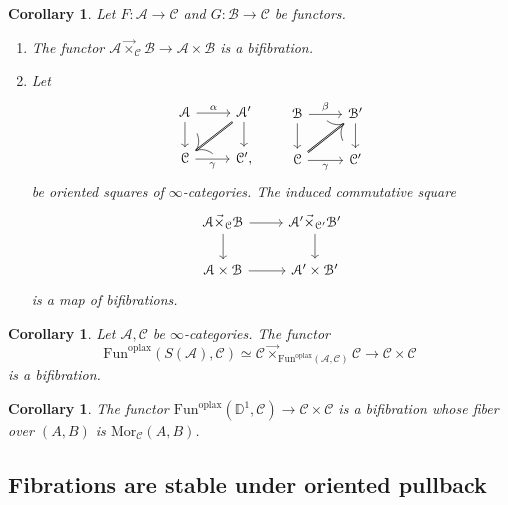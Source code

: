 \documentclass[10pt,oneside]{article}
\numberwithin{equation}{section} %
\numberwithin{figure}{section} %
\theoremstyle{plain}
\newtheorem{corollary}[theorem]{Corollary}
\theoremstyle{definition}
\newcommand{\bD}{{\mathbb D}}
\newcommand{\mA}{{\mathcal A}}
\newcommand{\mB}{{\mathcal B}}
\newcommand{\mC}{{\mathcal C}}
\newcommand{\Fun}{\mathrm{Fun}}
\newcommand{\oplax}{{\mathrm{oplax}}}
\newcommand{\Mor}{{\mathrm{Mor}}}
\begin{document}
\begin{corollary}\label{targetFib}Let $F: \mA \to \mC$ and  $G: \mB \to \mC$ be functors.

\begin{enumerate}[\normalfont(1)]\setlength{\itemsep}{-2pt}
\item The functor $ \mA {\vec{\times}}_\mC \mB \to \mA \times \mB $
is a bifibration.

\item Let
$$
\begin{tikzcd}
\mA \ar{r}{\alpha} \ar{d}[swap]{} & \mA' \ar[double]{dl}{} \ar{d}{} \\
\mC  \ar{r}[swap]{\gamma} & \mC',
\end{tikzcd}
\qquad
\begin{tikzcd}
\mB \ar{r}{\beta} \ar{d}[swap]{} & \mB'  \ar{d}{} \\
\mC \ar[double]{ur}{} \ar{r}[swap]{\gamma} & \mC'
\end{tikzcd}
$$
be oriented squares of $\infty$-categories.
The induced commutative square
\begin{equation}\label{sqfibb2}
\begin{tikzcd}
\mA {\vec{\times}}_\mC \mB \ar{r}{} \ar{d}[swap]{} & \mA' {\vec{\times}}_{\mC'} \mB' \ar{d}{} \\
\mA \times \mB \ar{r}[swap]{} & \mA' \times \mB'
\end{tikzcd}
\end{equation}
is a map of bifibrations.
\end{enumerate}
\end{corollary}



\begin{corollary}\label{targetfibr}
Let $\mA, \mC$ be $\infty$-categories.
The functor $$\Fun^\oplax(S(\mA),\mC) \simeq \mC {\vec{\times}}_{\Fun^\oplax(\mA,\mC)} \mC \to \mC \times \mC $$
is a bifibration.
\end{corollary}

\begin{corollary}\label{targetfi2}
The functor $\Fun^{\oplax}(\bD^1,\mC)\to\mC\times\mC$ is a bifibration whose fiber over $(A,B)$ is $\Mor_\mC(A,B)$.
\end{corollary}


\subsection{Fibrations are stable under oriented pullback}
\end{document}
